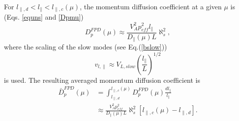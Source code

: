 \documentclass[preprint2,twocolumn,times,tighten]{aastex63}
\begin{document}
{For $l_{\|,d}<l_\|<l_{\|,c} (\mu)$, 
the momentum diffusion coefficient at a given $\mu$ is 
(Eqs. \eqref{equns} and \eqref{Dpmu})
    \begin{equation}
    D_p^{FPD} (\mu) 
    \approx \frac{V_A^2 p_{eff}^2 l_\|}{ D_\| (\mu)L} \aleph_s^2,
    \label{Dmufast}
\end{equation}
where the scaling of the slow modes (see Eq.(\ref{bslow})) 
\begin{equation}
    v_{l,\|}\approx V_{L,slow} \left(\frac{l_\|}{L}\right)^{1/2}
    \label{scalslow}
\end{equation}
is used.
The resulting  averaged momentum diffusion coefficient is 
\begin{equation}
\begin{aligned}
    \bar{D}_p^{FPD} (\mu)
    &= \int_{l_{\|, d}}^{l_{\|, c} (\mu)} D_p^{FPD} (\mu) \frac{dl_\|}{l_{\|}} \\
  & \approx \frac{V_A^2 p_{eff}^2}{D_\| (\mu) L} \aleph_s^2 \left[l_{\|,c}(\mu)-l_{\|,d}\right].

\end{aligned}
\end{equation}}
\end{document}
